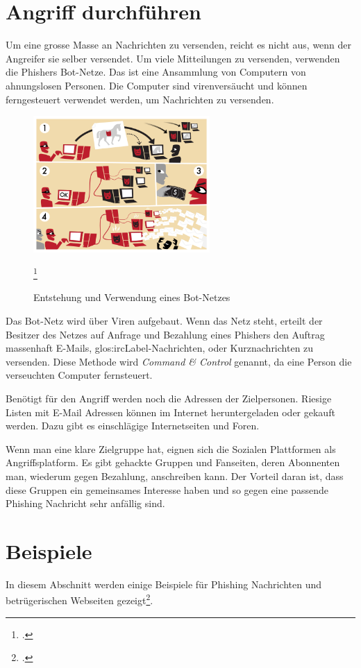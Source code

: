 \section{Angriff durchführen}
Um eine grosse Masse an Nachrichten zu versenden, reicht es nicht aus, wenn der Angreifer sie selber versendet. Um viele Mitteilungen zu versenden, verwenden die Phishers Bot-Netze. Das ist eine Ansammlung von Computern von ahnungslosen Personen. Die Computer sind virenversäucht und können ferngesteuert verwendet werden, um Nachrichten zu versenden.
\begin{figure}[H]
  \centering
  \includegraphics[width=0.6\textwidth]{images/botnet.png}
  \caption{Entstehung und Verwendung eines Bot-Netzes}
  \footcite{Botnet__Wikipedia_2015-05-22}
  \label{fig:phishing:angriffdurchfueren:botnetz}
\end{figure}
Das Bot-Netz wird über Viren aufgebaut. Wenn das Netz steht, erteilt der Besitzer des Netzes auf Anfrage und Bezahlung eines Phishers den Auftrag massenhaft E-Mails, \Gls{glos:ircLabel}-Nachrichten, oder Kurznachrichten zu versenden. Diese Methode wird \textit{Command \& Control} genannt, da eine Person die verseuchten Computer fernsteuert.

Benötigt für den Angriff werden noch die Adressen der Zielpersonen. Riesige Listen mit E-Mail Adressen können im Internet heruntergeladen oder gekauft werden. Dazu gibt es einschlägige Internetseiten und Foren. 

Wenn man eine klare Zielgruppe hat, eignen sich die Sozialen Plattformen als Angriffsplatform. Es gibt gehackte Gruppen und Fanseiten, deren Abonnenten man, wiederum gegen Bezahlung, anschreiben kann. Der Vorteil daran ist, dass diese Gruppen ein gemeinsames Interesse haben und so gegen eine passende Phishing Nachricht sehr anfällig sind.

\section{Beispiele}
In diesem Abschnitt werden einige Beispiele für Phishing Nachrichten und betrügerischen Webseiten gezeigt\footcite{Was_sind_Phishing_emails_2015-05-22}.

